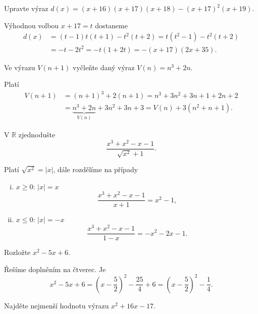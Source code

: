 \begin{priklad}
    Upravte výraz $d(x)=(x+16)(x+17)(x+18)-(x+17)^2(x+19).$
\end{priklad}

\begin{reseni}
 Výhodnou volbou $x+17=t$ dostaneme
 \begin{align*}
 d(x)&=(t-1)t(t+1)-t^2(t+2)=t \left( t^2-1 \right ) -t^2(t+2)\\
 &= -t-2t^2 = -t(1+2t)=-(x+17)(2x+35).
 \end{align*}
\end{reseni}

\begin{priklad}
    Ve výrazu $V(n+1)$ vyčleňte daný výraz $V(n)=n^3+2n.$
\end{priklad}

\begin{reseni}
 Platí
 \begin{align*}
   V(n+1) &= (n+1)^3 + 2(n+1) = n^3 + 3n^2 + 3n + 1+ 2n +2 \\
   & = \underbrace{n^3+ 2n}_{V(n)} + 3n^2 + 3n + 3 = V(n) + 3(n^2+n+1).
 \end{align*}
\end{reseni}

\begin{priklad}
V $\mathbb R$ zjednodušte
$$\frac{x^3+x^2-x-1}{\sqrt{x^2}+1 }.$$
\end{priklad}

\begin{reseni}
Platí $\sqrt{x^2}=|x| $, dále rozdělíme na případy
\begin{enumerate}[i.]
	\item $x \geq 0$: $|x| = x$ $$\frac{x^3+x^2-x-1}{x+1} = x^2 - 1,$$
	\item $x \leq 0$: $|x| = -x$ $$\frac{x^3+x^2-x-1}{1-x} = -x^2 - 2x - 1.$$
\end{enumerate}
\end{reseni}

\begin{priklad}
Rozložte $x^2-5x+6$.
\end{priklad}

\begin{reseni}
Řešíme doplněním na čtverec. Je
$$x^2-5x+6=\left(x-\frac{5}{2}\right)^2-\frac{25}{4}+6=\left(x-\frac{5}{2}\right)^2-\frac{1}{4}.$$
\end{reseni}

\begin{priklad}
Najděte nejmenší hodnotu výrazu $x^2+16x-17.$
\end{priklad}

